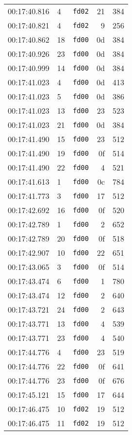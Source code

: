 \documentclass{article}
\begin{document}
\begin{longtable}{lllrr}
00:17:40.816 & 4 & \texttt{fd02} & 21 & 384 \\
00:17:40.821 & 4 & \texttt{fd02} & 9 & 256 \\
00:17:40.862 & 18 & \texttt{fd00} & 0d & 384 \\
00:17:40.926 & 23 & \texttt{fd00} & 0d & 384 \\
00:17:40.999 & 14 & \texttt{fd00} & 0d & 384 \\
00:17:41.023 & 4 & \texttt{fd00} & 0d & 413 \\
00:17:41.023 & 5 & \texttt{fd00} & 0d & 386 \\
00:17:41.023 & 13 & \texttt{fd00} & 23 & 523 \\
00:17:41.023 & 21 & \texttt{fd00} & 0d & 384 \\
00:17:41.490 & 15 & \texttt{fd00} & 23 & 512 \\
00:17:41.490 & 19 & \texttt{fd00} & 0f & 514 \\
00:17:41.490 & 22 & \texttt{fd00} & 4 & 521 \\
00:17:41.613 & 1 & \texttt{fd00} & 0c & 784 \\
00:17:41.773 & 3 & \texttt{fd00} & 17 & 512 \\
00:17:42.692 & 16 & \texttt{fd00} & 0f & 520 \\
00:17:42.789 & 1 & \texttt{fd00} & 2 & 652 \\
00:17:42.789 & 20 & \texttt{fd00} & 0f & 518 \\
00:17:42.907 & 10 & \texttt{fd00} & 22 & 651 \\
00:17:43.065 & 3 & \texttt{fd00} & 0f & 514 \\
00:17:43.474 & 6 & \texttt{fd00} & 1 & 780 \\
00:17:43.474 & 12 & \texttt{fd00} & 2 & 640 \\
00:17:43.721 & 24 & \texttt{fd00} & 2 & 643 \\
00:17:43.771 & 13 & \texttt{fd00} & 4 & 539 \\
00:17:43.771 & 23 & \texttt{fd00} & 4 & 540 \\
00:17:44.776 & 4 & \texttt{fd00} & 23 & 519 \\
00:17:44.776 & 22 & \texttt{fd00} & 0f & 641 \\
00:17:44.776 & 23 & \texttt{fd00} & 0f & 676 \\
00:17:45.121 & 15 & \texttt{fd00} & 17 & 644 \\
00:17:46.475 & 10 & \texttt{fd02} & 19 & 512 \\
00:17:46.475 & 11 & \texttt{fd02} & 19 & 512 \\

\end{longtable}
\end{document}
